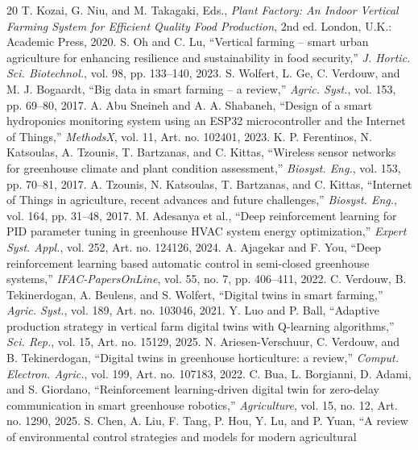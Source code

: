 \documentclass[conference]{IEEEtran}
\begin{document}
\begin{thebibliography}{20}
 T. Kozai, G. Niu, and M. Takagaki, Eds., \emph{Plant Factory:
An Indoor Vertical Farming System for Efficient Quality Food Production}, 2nd ed.
London, U.K.: Academic Press, 2020.
 S. Oh and C. Lu, ``Vertical farming -- smart urban agriculture for
enhancing resilience and sustainability in food security,'' \emph{J. Hortic. Sci.
Biotechnol.}, vol. 98, pp. 133--140, 2023.
 S. Wolfert, L. Ge, C. Verdouw, and M. J. Bogaardt, ``Big data
in smart farming -- a review,'' \emph{Agric. Syst.}, vol. 153, pp. 69--80, 2017.
 A. Abu Sneineh and A. A. Shabaneh, ``Design of a smart
hydroponics monitoring system using an ESP32 microcontroller and the Internet of
Things,'' \emph{MethodsX}, vol. 11, Art. no. 102401, 2023.
 K. P. Ferentinos, N. Katsoulas, A. Tzounis, T. Bartzanas,
and C. Kittas, ``Wireless sensor networks for greenhouse climate and plant
condition assessment,'' \emph{Biosyst. Eng.}, vol. 153, pp. 70--81, 2017.
 A. Tzounis, N. Katsoulas, T. Bartzanas, and C. Kittas,
``Internet of Things in agriculture, recent advances and future challenges,''
\emph{Biosyst. Eng.}, vol. 164, pp. 31--48, 2017.
 M. Adesanya et al., ``Deep reinforcement learning for PID
parameter tuning in greenhouse HVAC system energy optimization,'' \emph{Expert
Syst. Appl.}, vol. 252, Art. no. 124126, 2024.
 A. Ajagekar and F. You, ``Deep reinforcement learning based
automatic control in semi-closed greenhouse systems,'' \emph{IFAC-PapersOnLine},
vol. 55, no. 7, pp. 406--411, 2022.
 C. Verdouw, B. Tekinerdogan, A. Beulens, and S. Wolfert,
``Digital twins in smart farming,'' \emph{Agric. Syst.}, vol. 189, Art. no. 103046,
2021.
 Y. Luo and P. Ball, ``Adaptive production strategy in vertical
farm digital twins with Q-learning algorithms,'' \emph{Sci. Rep.}, vol. 15,
Art. no. 15129, 2025.
 N. Ariesen-Verschuur, C. Verdouw, and B. Tekinerdogan,
``Digital twins in greenhouse horticulture: a review,'' \emph{Comput. Electron.
Agric.}, vol. 199, Art. no. 107183, 2022.
 C. Bua, L. Borgianni, D. Adami, and S. Giordano, ``Reinforcement
learning-driven digital twin for zero-delay communication in smart greenhouse
robotics,'' \emph{Agriculture}, vol. 15, no. 12, Art. no. 1290, 2025.
 S. Chen, A. Liu, F. Tang, P. Hou, Y. Lu, and P. Yuan, ``A review
of environmental control strategies and models for modern agricultural

\end{thebibliography}
\end{document}
